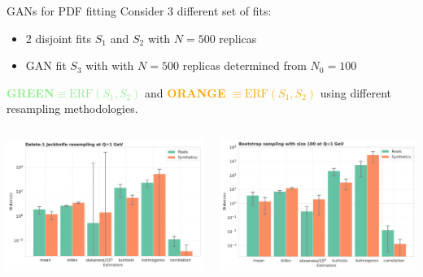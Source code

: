\begin{frame}{GANs for PDF fitting}
	Consider 3 different set of fits:
	\begin{itemize}
		\item 2 disjoint fits $S_1$ and $S_2$ with $N=500$ replicas
		\item GAN fit $S_3$ with with $N=500$ replicas determined from $N_0=100$
	\end{itemize}
	\textcolor{LightGreen}{\textbf{GREEN}$\equiv \text{ERF}(S_1,S_2)$} and \textcolor{orange}{\textbf{ORANGE}
		$\equiv \text{ERF}(S_1,S_2)$} using different resampling methodologies.
	\begin{columns}[T] 
		\begin{column}{.5\textwidth}
			\includegraphics[width=\linewidth]{./gan_compressor/imgs/jackknife-v1.pdf}
		\end{column}
		\hfill
		\begin{column}{.5\textwidth}	
			\includegraphics[width=\linewidth]{./gan_compressor/imgs/bootstrap.pdf}
		\end{column}
	\end{columns}
\end{frame}
